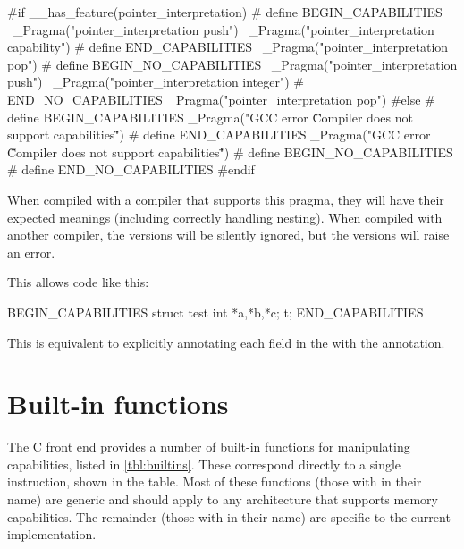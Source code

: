\begin{csnippet}
#if __has_feature(pointer_interpretation)
#	define BEGIN_CAPABILITIES \
		_Pragma("pointer_interpretation push") \
		_Pragma("pointer_interpretation capability")
#	define END_CAPABILITIES \
		_Pragma("pointer_interpretation pop")
#	define BEGIN_NO_CAPABILITIES \
		_Pragma("pointer_interpretation push") \
		_Pragma("pointer_interpretation integer")
#	 END_NO_CAPABILITIES
		_Pragma("pointer_interpretation pop")
#else
#	define BEGIN_CAPABILITIES
		_Pragma("GCC error \"Compiler does not support capabilities\"")
#	define END_CAPABILITIES
		_Pragma("GCC error \"Compiler does not support capabilities\"")
#	define BEGIN_NO_CAPABILITIES
#	define END_NO_CAPABILITIES
#endif
\end{csnippet}

When compiled with a compiler that supports this pragma, they will have their expected meanings (including correctly handling nesting).
When compiled with another compiler, the  versions will be silently ignored, but the  versions will raise an error.

This allows code like this:

\begin{csnippet}
BEGIN_CAPABILITIES
struct test
{
	int *a,*b,*c;
} t;
END_CAPABILITIES
\end{csnippet}

This is equivalent to explicitly annotating each field in the  with the  annotation.


\section{Built-in functions}

The C front end provides a number of built-in functions for manipulating capabilities, listed in \autoref{tbl:builtins}.
These correspond directly to a single instruction, shown in the table.
Most of these functions (those with  in their name) are generic and should apply to any architecture that supports memory capabilities.
The remainder (those with  in their name) are specific to the current implementation.

